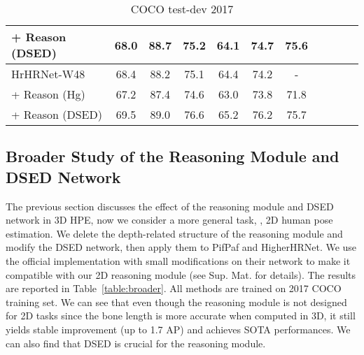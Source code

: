 \begin{table}
\begin{subtable}[t]{.495\textwidth}
{\begin{tabular}{lcccccccccc}
        \quad + Reason (DSED) & 68.0 & 88.7 & 75.2 & 64.1 & 74.7 & 75.6\\
        \midrule
        HrHRNet-W48~\cite{cheng2020higherhrnet} & 68.4 & 88.2 & 75.1 & 64.4 & 74.2 & -  \\
        \quad + Reason (Hg) & 67.2 &  87.4 & 74.6 & 63.0 & 73.8 & 71.8\\
        \quad + Reason (DSED) & 69.5 & 89.0 & 76.6 & 65.2 & 76.2 & 75.7\\
        \bottomrule
        \end{tabular}}
        \caption{COCO test-dev 2017}
    \end{subtable}
\end{table}

\subsection{Broader Study of the Reasoning Module and DSED Network}
\label{sec:broaderStudy}
The previous section discusses the effect of the reasoning module and DSED network in 3D HPE, now we consider a more general task, \ie, 2D human pose estimation. We delete the depth-related structure of the reasoning module and modify the DSED network, then apply them to PifPaf and HigherHRNet. We use the official implementation with small modifications on their network to make it compatible with our 2D reasoning module (see Sup. Mat. for details). The results are reported in Table~\ref{table:broader}. All methods are trained on 2017 COCO training set. We can see that even though the reasoning module is not designed for 2D tasks since the bone length is more accurate when computed in 3D, it still yields stable improvement (up to 1.7 AP) and achieves SOTA performances. We can also find that DSED is crucial for the reasoning module. 

\begin{table}
    \setlength{\abovecaptionskip}{0.05cm}
    \setlength{\belowcaptionskip}{-0.15cm}
    \renewcommand\arraystretch{0.5}
    \renewcommand{\baselinestretch}{0.8}
    \small 
    \centering
    \caption{\textbf{Evaluation of occluded joint detection.} The left half compares the generated occlusion labels and the right half shows the model performance trained on these labels. For the left half, we randomly select 500 from 200k images in MuCo-3DHP and manually annotate them to get ground-truth labels.}
    \label{table:occL}
\end{table}

